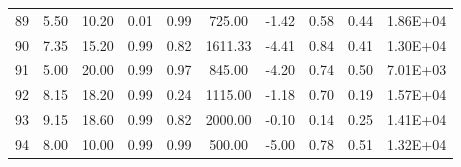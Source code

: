 \begin{landscape}
\begin{center}
\begin{longtable}{|c|c|c|c|c|c|c|c|c|c|}
89 & 5.50  & 10.20 & 0.01 & 0.99 & 725.00  & -1.42 & 0.58  & 0.44 & 1.86E+04 \\
90 & 7.35  & 15.20 & 0.99 & 0.82 & 1611.33 & -4.41 & 0.84  & 0.41 & 1.30E+04 \\
91 & 5.00  & 20.00 & 0.99 & 0.97 & 845.00  & -4.20 & 0.74  & 0.50 & 7.01E+03 \\
92 & 8.15  & 18.20 & 0.99 & 0.24 & 1115.00 & -1.18 & 0.70  & 0.19 & 1.57E+04 \\
93 & 9.15  & 18.60 & 0.99 & 0.82 & 2000.00 & -0.10 & 0.14  & 0.25 & 1.41E+04 \\
94 & 8.00  & 10.00 & 0.99 & 0.99 & 500.00  & -5.00 & 0.78  & 0.51 & 1.32E+04 \\\bottomrule

\end{longtable}
\end{center}
\end{landscape}



